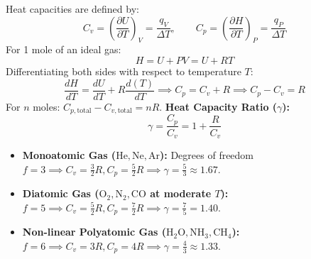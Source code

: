 \documentclass[10pt,a4paper]{article}
\begin{document}
\begin{formulabox}[Derivation of Mayer's Relation: $C_p - C_v = R$]
Heat capacities are defined by:
\begin{equation}
  C_v = \left(\frac{\partial U}{\partial T}\right)_V = \frac{q_V}{\Delta T}, \qquad C_p = \left(\frac{\partial H}{\partial T}\right)_P = \frac{q_P}{\Delta T}
\end{equation}
For 1 mole of an ideal gas:
\begin{equation}
  H = U + P V = U + R T
\end{equation}
Differentiating both sides with respect to temperature $T$:
\begin{equation}
  \frac{dH}{dT} = \frac{dU}{dT} + R \frac{d(T)}{dT} \implies C_p = C_v + R \implies C_p - C_v = R
\end{equation}
For $n$ moles: $C_{p,\text{total}} - C_{v,\text{total}} = n R$.
\textbf{Heat Capacity Ratio ($\gamma$):}
\begin{equation}
  \gamma = \frac{C_p}{C_v} = 1 + \frac{R}{C_v}
\end{equation}
\begin{itemize}
  \item \textbf{Monoatomic Gas ($\mathrm{He, Ne, Ar}$):} Degrees of freedom $f = 3 \implies C_v = \frac{3}{2}R, C_p = \frac{5}{2}R \implies \gamma = \frac{5}{3} \approx 1.67$.
  \item \textbf{Diatomic Gas ($\mathrm{O_2, N_2, CO}$ at moderate $T$):} $f = 5 \implies C_v = \frac{5}{2}R, C_p = \frac{7}{2}R \implies \gamma = \frac{7}{5} = 1.40$.
  \item \textbf{Non-linear Polyatomic Gas ($\mathrm{H_2O, NH_3, CH_4}$):} $f = 6 \implies C_v = 3R, C_p = 4R \implies \gamma = \frac{4}{3} \approx 1.33$.
\end{itemize}
\end{formulabox}
\end{document}
